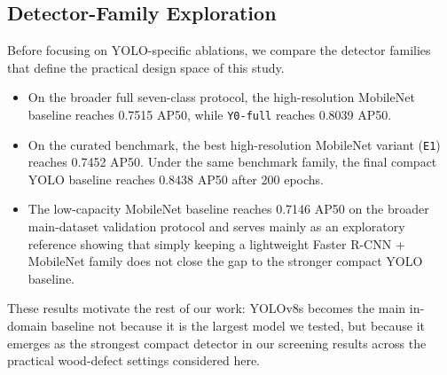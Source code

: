 \documentclass[10pt,a4paper]{article}
\begin{document}
\subsection{Detector-Family Exploration}
\label{sec:family-results}

Before focusing on YOLO-specific ablations, we compare the detector families that define the practical design space of this study.

\begin{itemize}[leftmargin=1.5em]
  \item On the broader full seven-class protocol, the high-resolution MobileNet baseline reaches 0.7515 AP50, while \texttt{Y0-full} reaches 0.8039 AP50.
  \item On the curated benchmark, the best high-resolution MobileNet variant (\texttt{E1}) reaches 0.7452 AP50. Under the same benchmark family, the final compact YOLO baseline reaches 0.8438 AP50 after 200 epochs.
  \item The low-capacity MobileNet baseline reaches 0.7146 AP50 on the broader main-dataset validation protocol and serves mainly as an exploratory reference showing that simply keeping a lightweight Faster R-CNN + MobileNet family does not close the gap to the stronger compact YOLO baseline.
\end{itemize}

These results motivate the rest of our work: YOLOv8s becomes the main in-domain baseline not because it is the largest model we tested, but because it emerges as the strongest compact detector in our screening results across the practical wood-defect settings considered here.
\end{document}
